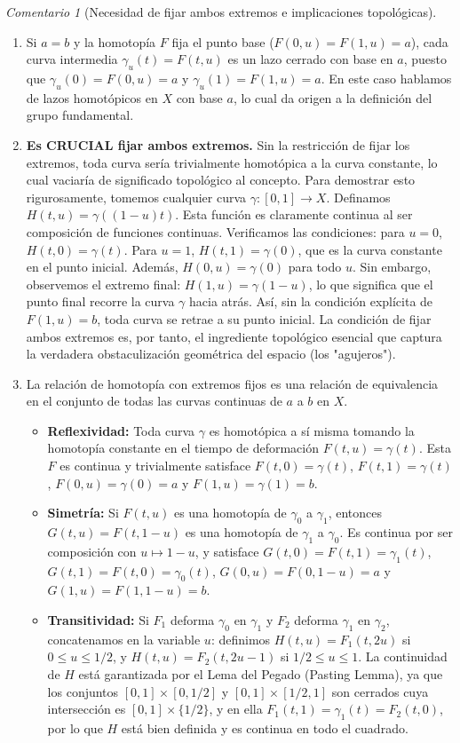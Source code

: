 \documentclass[11pt,a4paper]{article}
\theoremstyle{definition}
\theoremstyle{remark}
\newtheorem{observacion}{Comentario}[section]
\numberwithin{equation}{section}
\begin{document}
\begin{observacion}[Necesidad de fijar ambos extremos e implicaciones topológicas]
\begin{enumerate}
    \item Si $a=b$ y la homotopía $F$ fija el punto base ($F(0,u)=F(1,u)=a$), cada curva intermedia $\gamma_u(t)=F(t,u)$ es un lazo cerrado con base en $a$, puesto que $\gamma_u(0)=F(0,u)=a$ y $\gamma_u(1)=F(1,u)=a$. En este caso hablamos de lazos homotópicos en $X$ con base $a$, lo cual da origen a la definición del grupo fundamental.
    \item \textbf{Es CRUCIAL fijar ambos extremos.} Sin la restricción de fijar los extremos, toda curva sería trivialmente homotópica a la curva constante, lo cual vaciaría de significado topológico al concepto. Para demostrar esto rigurosamente, tomemos cualquier curva $\gamma : [0,1] \to X$. Definamos $H(t,u) = \gamma((1-u)t)$. Esta función es claramente continua al ser composición de funciones continuas. Verificamos las condiciones: para $u=0$, $H(t,0) = \gamma(t)$. Para $u=1$, $H(t,1) = \gamma(0)$, que es la curva constante en el punto inicial. Además, $H(0,u) = \gamma(0)$ para todo $u$. Sin embargo, observemos el extremo final: $H(1,u) = \gamma(1-u)$, lo que significa que el punto final recorre la curva $\gamma$ hacia atrás. Así, sin la condición explícita de $F(1,u)=b$, toda curva se retrae a su punto inicial. La condición de fijar ambos extremos es, por tanto, el ingrediente topológico esencial que captura la verdadera obstaculización geométrica del espacio (los "agujeros").
    \item La relación de homotopía con extremos fijos es una relación de equivalencia en el conjunto de todas las curvas continuas de $a$ a $b$ en $X$. 
    \begin{itemize}
        \item \textbf{Reflexividad:} Toda curva $\gamma$ es homotópica a sí misma tomando la homotopía constante en el tiempo de deformación $F(t,u) = \gamma(t)$. Esta $F$ es continua y trivialmente satisface $F(t,0)=\gamma(t)$, $F(t,1)=\gamma(t)$, $F(0,u)=\gamma(0)=a$ y $F(1,u)=\gamma(1)=b$.
        \item \textbf{Simetría:} Si $F(t,u)$ es una homotopía de $\gamma_0$ a $\gamma_1$, entonces $G(t,u) = F(t,1-u)$ es una homotopía de $\gamma_1$ a $\gamma_0$. Es continua por ser composición con $u \mapsto 1-u$, y satisface $G(t,0)=F(t,1)=\gamma_1(t)$, $G(t,1)=F(t,0)=\gamma_0(t)$, $G(0,u)=F(0,1-u)=a$ y $G(1,u)=F(1,1-u)=b$.
        \item \textbf{Transitividad:} Si $F_1$ deforma $\gamma_0$ en $\gamma_1$ y $F_2$ deforma $\gamma_1$ en $\gamma_2$, concatenamos en la variable $u$: definimos $H(t,u) = F_1(t, 2u)$ si $0 \le u \le 1/2$, y $H(t,u) = F_2(t, 2u-1)$ si $1/2 \le u \le 1$. La continuidad de $H$ está garantizada por el Lema del Pegado (Pasting Lemma), ya que los conjuntos $[0,1] \times [0,1/2]$ y $[0,1] \times [1/2,1]$ son cerrados cuya intersección es $[0,1] \times \{1/2\}$, y en ella $F_1(t,1) = \gamma_1(t) = F_2(t,0)$, por lo que $H$ está bien definida y es continua en todo el cuadrado.

\end{itemize}
\end{enumerate}
\end{observacion}
\end{document}

